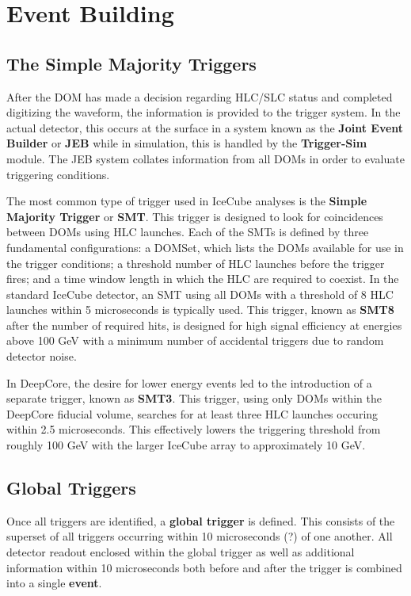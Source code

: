 \section{Event Building}
\subsection{The Simple Majority Triggers}
After the DOM has made a decision regarding HLC/SLC status and completed digitizing the waveform, the information is provided to the trigger system.
In the actual detector, this occurs at the surface in a system known as the \textbf{Joint Event Builder} or \textbf{JEB} while in simulation, this is handled by the \textbf{Trigger-Sim} module. 
The JEB system collates information from all DOMs in order to evaluate triggering conditions.

The most common type of trigger used in IceCube analyses is the \textbf{Simple Majority Trigger} or \textbf{SMT}. 
This trigger is designed to look for coincidences between DOMs using HLC launches.
Each of the SMTs is defined by three fundamental configurations: a DOMSet, which lists the DOMs available for use in the trigger conditions; a threshold number of HLC launches before the trigger fires; and a time window length in which the HLC are required to coexist.
In the standard IceCube detector, an SMT using all DOMs with a threshold of 8 HLC launches within 5 microseconds is typically used.
This trigger, known as \textbf{SMT8} after the number of required hits, is designed for high signal efficiency at energies above 100 GeV with a minimum number of accidental triggers due to random detector noise.

In DeepCore, the desire for lower energy events led to the introduction of a separate trigger, known as \textbf{SMT3}.
This trigger, using only DOMs within the DeepCore fiducial volume, searches for at least three HLC launches occuring within 2.5 microseconds.
This effectively lowers the triggering threshold from roughly 100 GeV with the larger IceCube array to approximately 10 GeV.

\subsection{Global Triggers}
Once all triggers are identified, a \textbf{global trigger} is defined. 
This consists of the superset of all triggers occurring within 10 microseconds (?) of one another.
All detector readout enclosed within the global trigger as well as additional information within 10 microseconds both before and after the trigger is combined into a single \textbf{event}.